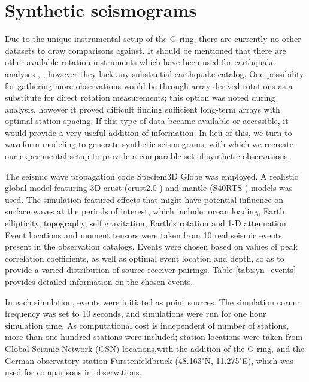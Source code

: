 \documentclass{gji}
\begin{document}
\section{Synthetic seismograms}
Due to the unique instrumental setup of the G-ring, there are currently no other datasets to draw comparisons against. It should be mentioned that there are other available rotation instruments which have been used for earthquake analyses \cite{donner2017comparing}, \cite{sbaa2017analysis}, however they lack any substantial earthquake catalog. One possibility for gathering more observations would be through array derived rotations as a substitute for direct rotation measurements; this option was noted during analysis, however it proved difficult finding sufficient long-term arrays with optimal station spacing. If this type of data became available or accessible, it would provide a very useful addition of information. In lieu of this, we turn to waveform modeling to generate synthetic seismograms, with which we recreate our experimental setup to provide a comparable set of synthetic observations.

The seismic wave propagation code Specfem3D Globe was employed. A realistic global model featuring 3D crust (crust2.0 \cite{Bassin2000}) and mantle (S40RTS \cite{Ritsema2011}) models was used. The simulation featured effects that might have potential influence on surface waves at the periods of interest, which include: ocean loading, Earth ellipticity, topography, self gravitation, Earth's rotation and 1-D attenuation. Event locations and moment tensors were taken from 10 real seismic events present in the observation catalogs. Events were chosen based on values of peak correlation coefficients, as well as optimal event location and depth, so as to provide a varied distribution of source-receiver pairings. Table \ref{tab:syn_events} provides detailed information on the chosen events. 

In each simulation, events were initiated as point sources. The simulation corner frequency was set to 10 seconds, and simulations were run for one hour simulation time. As computational cost is independent of number of stations, more than one hundred stations were included; station locations were taken from Global Seismic Network (GSN) locations,with the addition of the G-ring, and the German observatory station F\"urstenfeldbruck (48.163$^\circ$N, 11.275$^\circ$E), which was used for comparisons in observations.
\end{document}
